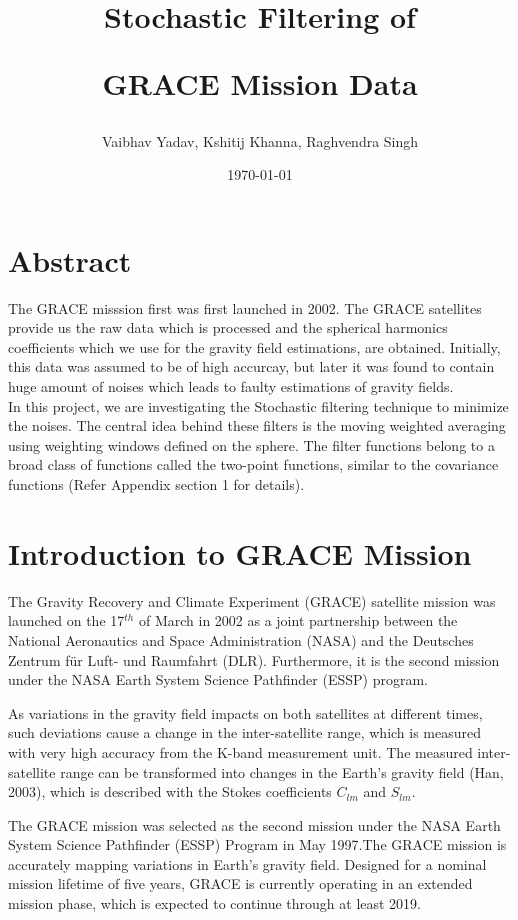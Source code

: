 \documentclass[a4paper,12pt]{report}
\title{\centerline{\textbf{Stochastic Filtering of}} \centerline{\textbf{GRACE Mission Data}}}
\author{Vaibhav Yadav, Kshitij Khanna, Raghvendra Singh}
\date{\today}
\begin{document}
\maketitle


\chapter*{Abstract}
The GRACE misssion first was first launched in 2002. The GRACE satellites provide us the raw data which is processed and the spherical harmonics coefficients which we use for the gravity field estimations, are obtained. Initially, this data was assumed to be of high accurcay, but later it was found to contain huge amount of noises which leads to faulty estimations of gravity fields.\\
In this project, we are investigating the Stochastic filtering technique to minimize the noises.
The central idea behind these filters is the moving weighted averaging using weighting windows
defined on the sphere. The filter functions belong to a broad class of functions called the two-point
functions, similar to the covariance functions (Refer Appendix section 1 for details).

\tableofcontents

\newpage
\chapter{Introduction to GRACE Mission}
 The Gravity Recovery and Climate Experiment (GRACE) satellite mission was launched
on the 17$^{th}$ of March in 2002 as a joint partnership between the National Aeronautics
and Space Administration (NASA) and the Deutsches Zentrum für Luft- und Raumfahrt
(DLR). Furthermore, it is the second mission under the NASA Earth System Science
Pathfinder (ESSP) program.

As variations in the gravity field impacts on both satellites at different times, such
deviations cause a change in the inter-satellite range, which is measured with very high
accuracy from the K-band measurement unit. The measured inter-satellite range can
be transformed into changes in the Earth’s gravity field (Han, 2003), which is described
with the Stokes coefficients $C_{lm}$ and $S_{lm}$.


The GRACE mission was selected as the second mission under the NASA Earth System Science Pathfinder (ESSP) Program in May 1997.The GRACE mission is accurately mapping variations in Earth's gravity field. Designed for a nominal mission lifetime of five years, GRACE is currently operating in an extended mission phase, which is expected to continue through at least 2019.
\end{document}
